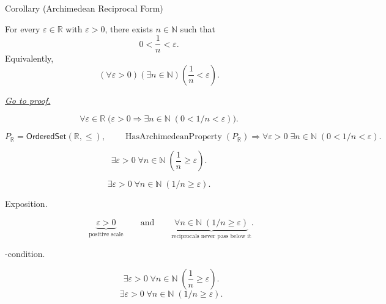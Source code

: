\begin{corollarybox}{Corollary (Archimedean Reciprocal Form)}
\begin{corollary}
\label{cor:archimedean-reciprocal-form}
For every $\varepsilon\in\mathbb{R}$ with $\varepsilon>0$, there exists
$n\in\mathbb{N}$ such that
\[
  0<\frac{1}{n}<\varepsilon.
\]
Equivalently,
\[
  (\forall\varepsilon>0)(\exists n\in\mathbb{N})\left(\frac{1}{n}<\varepsilon\right).
\]

\smallskip
\noindent
\hyperref[prf:archimedean-reciprocal-form]{\textit{Go to proof.}}
\end{corollary}
\end{corollarybox}

\begin{remark*}
\[
\forall \varepsilon\in\mathbb{R}\;
\bigl(\varepsilon>0\Longrightarrow
\exists n\in\mathbb{N}\;(0<1/n<\varepsilon)\bigr).
\]
\end{remark*}

\begin{remark*}
\[
P_{\mathbb{R}}=\mathsf{OrderedSet}(\mathbb{R},\leq),\qquad
\operatorname{HasArchimedeanProperty}(P_{\mathbb{R}})
\Longrightarrow
\forall \varepsilon>0\;\exists n\in\mathbb{N}\;(0<1/n<\varepsilon).
\]
\end{remark*}

\begin{remark*}
\[
\exists \varepsilon>0\;\forall n\in\mathbb{N}\;\left(\frac{1}{n}\ge \varepsilon\right).
\]
\end{remark*}

\begin{remark*}
\[
\exists \varepsilon>0\;\forall n\in\mathbb{N}\;(1/n\ge \varepsilon).
\]
\end{remark*}

\begin{remark*}
\begin{description}
  \item[Exposition.]
\[
\underbrace{\varepsilon>0}_{\text{positive scale}}
\qquad\text{and}\qquad
\underbrace{\forall n\in\mathbb{N}\;(1/n\ge\varepsilon)}_{\text{reciprocals never pass below it}}.
\]


  \item[\exists-condition.]
  \[
\exists \varepsilon>0\;\forall n\in\mathbb{N}\;\left(\frac{1}{n}\ge \varepsilon\right).
\]
\[
\exists \varepsilon>0\;\forall n\in\mathbb{N}\;(1/n\ge \varepsilon).
\]
\end{description}
\end{remark*}

